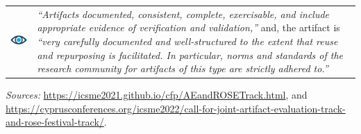 \begin{table}[h!]
\begin{tabular}{  c  m{8.3cm}  }
    \begin{minipage}{.2\textwidth}
      \includegraphics[width=\linewidth]{kappa/img/Research_Objects.png}
    \end{minipage}
    &
    \emph{``Artifacts documented, consistent, complete, exercisable, and include appropriate evidence of verification and validation,''}
    and, the artifact is
    \emph{``very carefully documented and well-structured to the extent that reuse and repurposing is facilitated. In particular, norms and standards of the research community for artifacts of this type are strictly adhered to.''}
    \\ 
  \end{tabular}
\end{table}
\emph{Sources:}  \url{https://icsme2021.github.io/cfp/AEandROSETrack.html}, and 
\url{https://cyprusconferences.org/icsme2022/call-for-joint-artifact-evaluation-track-and-rose-festival-track/}.